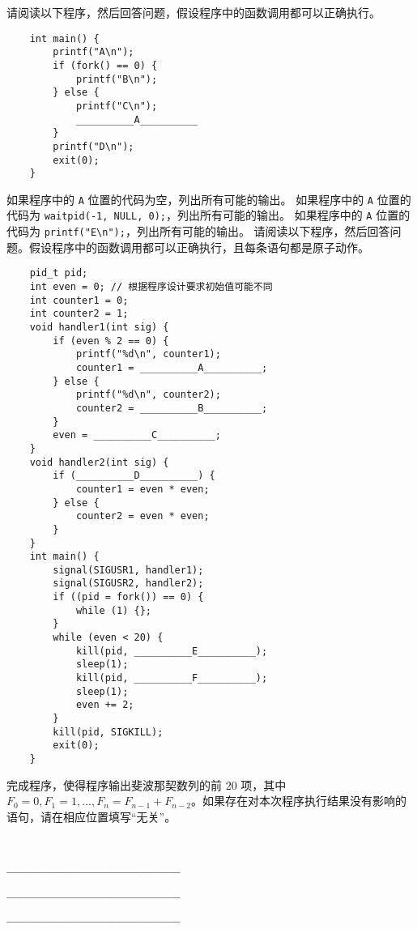 \begin{problems}
\begin{choices}
        \end{choices}
         请阅读以下程序，然后回答问题，假设程序中的函数调用都可以正确执行。
        \begin{verbatim}
    int main() {
        printf("A\n");
        if (fork() == 0) {
            printf("B\n");
        } else {
            printf("C\n");
            __________A__________
        }
        printf("D\n");
        exit(0);
    }
        \end{verbatim}
        \qn 如果程序中的 \verb|A| 位置的代码为空，列出所有可能的输出。
        \qn 如果程序中的 \verb|A| 位置的代码为 \verb|waitpid(-1, NULL, 0);|，列出所有可能的输出。
        \qn 如果程序中的 \verb|A| 位置的代码为 \verb|printf("E\n");|，列出所有可能的输出。
         请阅读以下程序，然后回答问题。假设程序中的函数调用都可以正确执行，且每条语句都是原子动作。
        \begin{verbatim}
    pid_t pid;
    int even = 0; // 根据程序设计要求初始值可能不同
    int counter1 = 0;
    int counter2 = 1;
    void handler1(int sig) {
        if (even % 2 == 0) {
            printf("%d\n", counter1);
            counter1 = __________A__________;
        } else {
            printf("%d\n", counter2);
            counter2 = __________B__________;
        }
        even = __________C__________;
    }
    void handler2(int sig) {
        if (__________D__________) {
            counter1 = even * even;
        } else {
            counter2 = even * even;
        }
    }
    int main() {
        signal(SIGUSR1, handler1);
        signal(SIGUSR2, handler2);
        if ((pid = fork()) == 0) {
            while (1) {};
        }
        while (even < 20) {
            kill(pid, __________E__________);
            sleep(1);
            kill(pid, __________F__________);
            sleep(1);
            even += 2;
        }
        kill(pid, SIGKILL);
        exit(0);
    }
        \end{verbatim}
        \qn 完成程序，使得程序输出斐波那契数列的前 20 项，其中 $F_0=0, F_1=1, \dotsc, F_n=F_{n-1}+F_{n-2}$。如果存在对本次程序执行结果没有影响的语句，请在相应位置填写“无关”。
        {\tt
        \begin{compactenum}[A：]
            \item \verb|______________________________|
            \item \verb|______________________________|
            \item \verb|______________________________|

\end{compactenum}}
\end{problems}
